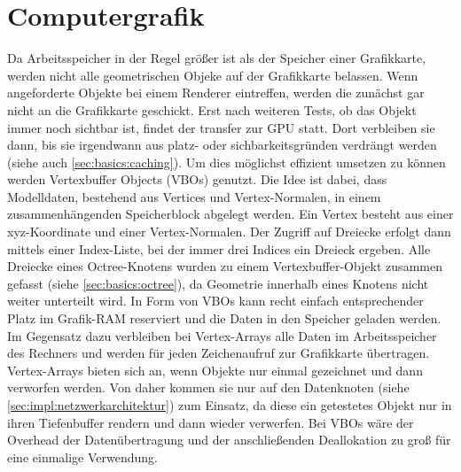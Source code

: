 \section{Computergrafik}
\label{sec:basics:computergrafik}
Da Arbeitsspeicher in der Regel größer ist als der Speicher einer Grafikkarte, werden nicht alle geometrischen Objeke auf der Grafikkarte belassen. Wenn angeforderte Objekte bei einem Renderer eintreffen, werden die zunächst gar nicht an die Grafikkarte geschickt. Erst nach weiteren Tests, ob das Objekt immer noch sichtbar ist, findet der transfer zur GPU statt. Dort verbleiben sie dann, bis sie irgendwann aus platz- oder sichbarkeitsgründen verdrängt werden (siehe auch \ref{sec:basics:caching}). Um dies möglichst effizient umsetzen zu können werden Vertexbuffer Objects  (VBOs) genutzt. Die Idee ist dabei, dass Modelldaten, bestehend aus Vertices und Vertex-Normalen, in einem zusammenhängenden Speicherblock abgelegt werden. Ein Vertex besteht aus einer xyz-Koordinate und einer Vertex-Normalen. Der Zugriff auf Dreiecke erfolgt dann mittels einer Index-Liste, bei der immer drei Indices ein Dreieck ergeben. Alle Dreiecke eines Octree-Knotens wurden zu einem Vertexbuffer-Objekt zusammen gefasst (siehe \ref{sec:basics:octree}), da Geometrie innerhalb eines Knotens nicht weiter unterteilt wird. In Form von VBOs kann recht einfach entsprechender Platz im Grafik-RAM reserviert und die Daten in den Speicher geladen werden.\\
Im Gegensatz dazu verbleiben bei Vertex-Arrays alle Daten im Arbeitsspeicher des Rechners und werden für jeden Zeichenaufruf zur Grafikkarte übertragen. Vertex-Arrays bieten sich an, wenn Objekte nur einmal gezeichnet und dann verworfen werden. Von daher kommen sie nur auf den Datenknoten (siehe \ref{sec:impl:netzwerkarchitektur}) zum Einsatz, da diese ein getestetes Objekt nur in ihren Tiefenbuffer rendern und dann wieder verwerfen. Bei VBOs wäre der Overhead der Datenübertragung und der anschließenden Deallokation zu groß für eine einmalige Verwendung.
